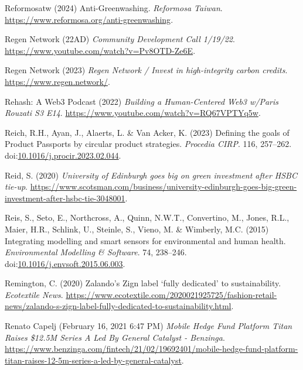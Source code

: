 \documentclass[
  letterpaper,
  DIV=11,
  numbers=noendperiod]{scrartcl}
\newlength{\cslhangindent}
\newenvironment{CSLReferences}[2] %
 {\begin{list}{}{%
  \setlength{\itemindent}{0pt}
  \setlength{\leftmargin}{0pt}
  \setlength{\parsep}{0pt}
  \ifodd #1
   \setlength{\leftmargin}{\cslhangindent}
   \setlength{\itemindent}{-1\cslhangindent}
  \fi
  \setlength{\itemsep}{#2\baselineskip}}}
 {\end{list}}
\begin{document}
\begin{CSLReferences}{0}{1}
Reformosatw (2024) Anti-{Greenwashing}. \emph{Reformosa Taiwan}.
\url{https://www.reformosa.org/anti-greenwashing}.

Regen Network (22AD) \emph{Community {Development Call} 1/19/22}.
\url{https://www.youtube.com/watch?v=Pv8OTD-Ze6E}.

Regen Network (2023) \emph{Regen {Network} / {Invest} in high-integrity
carbon credits}. \url{https://www.regen.network/}.

Rehash: A Web3 Podcast (2022) \emph{Building a {Human-Centered Web3}
w/{Paris Rouzati} {\textbar} {S3 E14}}.
\url{https://www.youtube.com/watch?v=RQ67VPTYq5w}.

Reich, R.H., Ayan, J., Alaerts, L. \& Van Acker, K. (2023) Defining the
goals of {Product Passports} by circular product strategies.
\emph{Procedia CIRP}. 116, 257--262.
doi:\href{https://doi.org/10.1016/j.procir.2023.02.044}{10.1016/j.procir.2023.02.044}.

Reid, S. (2020) \emph{University of {Edinburgh} goes big on green
investment after {HSBC} tie-up}.
\url{https://www.scotsman.com/business/university-edinburgh-goes-big-green-investment-after-hsbc-tie-3048001}.

Reis, S., Seto, E., Northcross, A., Quinn, N.W.T., Convertino, M.,
Jones, R.L., Maier, H.R., Schlink, U., Steinle, S., Vieno, M. \&
Wimberly, M.C. (2015) Integrating modelling and smart sensors for
environmental and human health. \emph{Environmental Modelling \&
Software}. 74, 238--246.
doi:\href{https://doi.org/10.1016/j.envsoft.2015.06.003}{10.1016/j.envsoft.2015.06.003}.

Remington, C. (2020) Zalando's {Zign} label {`fully dedicated'} to
sustainability. \emph{Ecotextile News}.
\url{https://www.ecotextile.com/2020021925725/fashion-retail-news/zalando-s-zign-label-fully-dedicated-to-sustainability.html}.

Renato Capelj (February 16, 2021 6:47 PM) \emph{Mobile {Hedge Fund
Platform Titan Raises} \$12.{5M Series A Led By General Catalyst} -
{Benzinga}}.
\url{https://www.benzinga.com/fintech/21/02/19692401/mobile-hedge-fund-platform-titan-raises-12-5m-series-a-led-by-general-catalyst}.


\end{CSLReferences}
\end{document}
